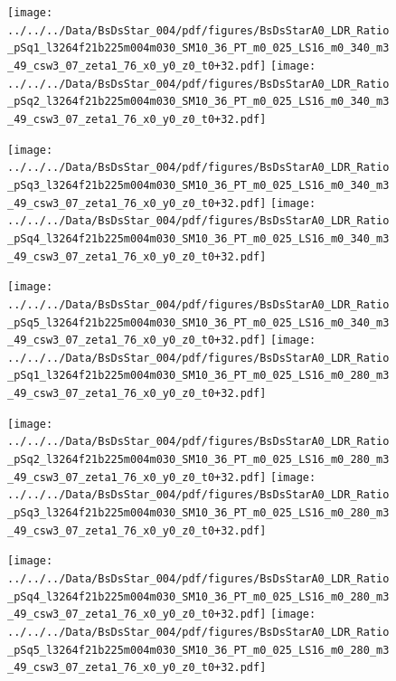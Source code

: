 \documentclass[a4paper,10pt]{article}
\begin{document}
\begin{figure}[p]
 \texttt{[image: ../../../Data/BsDsStar\_004/pdf/figures/BsDsStarA0\_LDR\_Ratio\_pSq1\_l3264f21b225m004m030\_SM10\_36\_PT\_m0\_025\_LS16\_m0\_340\_m3\_49\_csw3\_07\_zeta1\_76\_x0\_y0\_z0\_t0+32.pdf]} 
 \texttt{[image: ../../../Data/BsDsStar\_004/pdf/figures/BsDsStarA0\_LDR\_Ratio\_pSq2\_l3264f21b225m004m030\_SM10\_36\_PT\_m0\_025\_LS16\_m0\_340\_m3\_49\_csw3\_07\_zeta1\_76\_x0\_y0\_z0\_t0+32.pdf]} 
 \end{figure}
\begin{figure}[p]
 \texttt{[image: ../../../Data/BsDsStar\_004/pdf/figures/BsDsStarA0\_LDR\_Ratio\_pSq3\_l3264f21b225m004m030\_SM10\_36\_PT\_m0\_025\_LS16\_m0\_340\_m3\_49\_csw3\_07\_zeta1\_76\_x0\_y0\_z0\_t0+32.pdf]} 
 \texttt{[image: ../../../Data/BsDsStar\_004/pdf/figures/BsDsStarA0\_LDR\_Ratio\_pSq4\_l3264f21b225m004m030\_SM10\_36\_PT\_m0\_025\_LS16\_m0\_340\_m3\_49\_csw3\_07\_zeta1\_76\_x0\_y0\_z0\_t0+32.pdf]} 
 \end{figure}
\begin{figure}[p]
 \texttt{[image: ../../../Data/BsDsStar\_004/pdf/figures/BsDsStarA0\_LDR\_Ratio\_pSq5\_l3264f21b225m004m030\_SM10\_36\_PT\_m0\_025\_LS16\_m0\_340\_m3\_49\_csw3\_07\_zeta1\_76\_x0\_y0\_z0\_t0+32.pdf]} 
 \texttt{[image: ../../../Data/BsDsStar\_004/pdf/figures/BsDsStarA0\_LDR\_Ratio\_pSq1\_l3264f21b225m004m030\_SM10\_36\_PT\_m0\_025\_LS16\_m0\_280\_m3\_49\_csw3\_07\_zeta1\_76\_x0\_y0\_z0\_t0+32.pdf]} 
 \end{figure}
\clearpage
\begin{figure}[p]
 \texttt{[image: ../../../Data/BsDsStar\_004/pdf/figures/BsDsStarA0\_LDR\_Ratio\_pSq2\_l3264f21b225m004m030\_SM10\_36\_PT\_m0\_025\_LS16\_m0\_280\_m3\_49\_csw3\_07\_zeta1\_76\_x0\_y0\_z0\_t0+32.pdf]} 
 \texttt{[image: ../../../Data/BsDsStar\_004/pdf/figures/BsDsStarA0\_LDR\_Ratio\_pSq3\_l3264f21b225m004m030\_SM10\_36\_PT\_m0\_025\_LS16\_m0\_280\_m3\_49\_csw3\_07\_zeta1\_76\_x0\_y0\_z0\_t0+32.pdf]} 
 \end{figure}
\begin{figure}[p]
 \texttt{[image: ../../../Data/BsDsStar\_004/pdf/figures/BsDsStarA0\_LDR\_Ratio\_pSq4\_l3264f21b225m004m030\_SM10\_36\_PT\_m0\_025\_LS16\_m0\_280\_m3\_49\_csw3\_07\_zeta1\_76\_x0\_y0\_z0\_t0+32.pdf]} 
 \texttt{[image: ../../../Data/BsDsStar\_004/pdf/figures/BsDsStarA0\_LDR\_Ratio\_pSq5\_l3264f21b225m004m030\_SM10\_36\_PT\_m0\_025\_LS16\_m0\_280\_m3\_49\_csw3\_07\_zeta1\_76\_x0\_y0\_z0\_t0+32.pdf]} 
 \end{figure}
\clearpage
\end{document}
